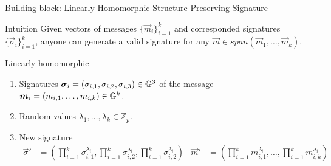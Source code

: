 \begin{frame}{Building block: Linearly Homomorphic Structure-Preserving Signature}
  \begin{block}{Intuition}
    Given vectors of messages $\{\vec{m}_i\}_{i=1}^k$ and corresponded signatures $\{\vec{\sigma}_i\}_{i=1}^k$, anyone can generate a valid signature for any $\vec{m} \in span(\vec{m}_1, \dots, \vec{m}_k)$.
  \end{block}

  \pause

  \begin{block}{Linearly homomorphic}
    \begin{enumerate}
    \item Signatures $\boldsymbol{\sigma}_i = (\sigma_{i,1}, \sigma_{i,2}, \sigma_{i,3}) \in \mathbb{G}^3$ of the message $\boldsymbol{m}_i = (m_{i,1}, \dots, m_{i,k}) \in \mathbb{G}^k$.
    \item Random values $\lambda_1, \dots, \lambda_k \in \mathbb{Z}_p$.
    \item New signature
      \begin{align*}
        \vec{\sigma}' &= (\prod_{i = 1}^k \sigma_{i,1}^{\lambda_i}, \prod_{i = 1}^k \sigma_{i,2}^{\lambda_i}, \prod_{i = 1}^k \sigma_{i,2}^{\lambda_i}) & \vec{m}' &= (\prod_{i = 1}^km_{i,1}^{\lambda_i}, \dots, \prod_{i = 1}^km_{i,k}^{\lambda_i})
      \end{align*}
    \end{enumerate}
  \end{block}

  
\end{frame}


